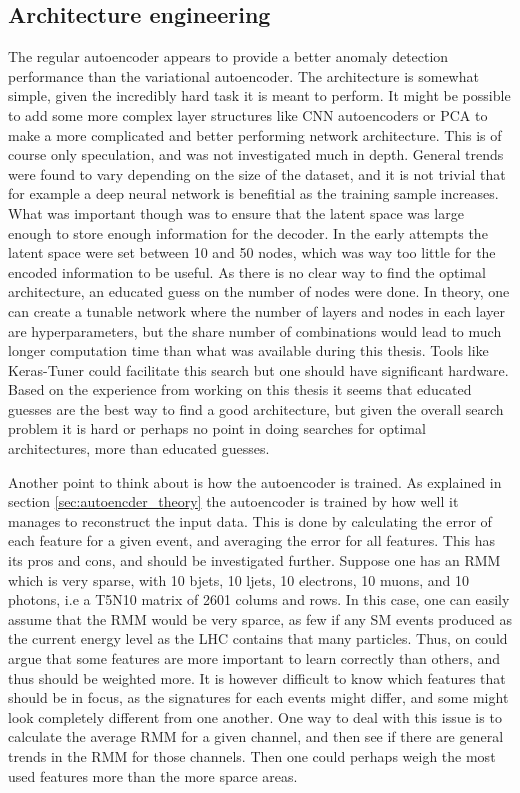 \subsection*{Architecture engineering}
The regular autoencoder appears to provide a better anomaly detection performance than the variational autoencoder. 
The architecture is somewhat simple, given the incredibly hard task it is meant to perform. It might be possible to 
add some more complex layer structures like CNN autoencoders or PCA to make a more complicated and better performing 
network architecture. This is of course only speculation, and was not investigated much in depth. General trends were 
found to vary depending on the size of the dataset, and it is not trivial that for example a deep neural network is 
benefitial as the training sample increases. What was important though was to ensure that the latent space was large 
enough to store enough information for the decoder. In the early attempts the latent space were set between 10 and 50 
nodes, which was way too little for the encoded information to be useful. As there is no clear way to find the optimal 
architecture, an educated guess on the number of nodes were done. In theory, one can create a tunable network where 
the number of layers and nodes in each layer are hyperparameters, but the share number of combinations would lead to 
much longer computation time than what was available during this thesis. Tools like Keras-Tuner could facilitate 
this search but one should have significant hardware. Based on the experience from working on this thesis it seems 
that educated guesses are the best way to find a good architecture, but given the overall search problem it is hard 
or perhaps no point in doing searches for optimal architectures, more than educated guesses. \par 
Another point to think about is how the autoencoder is trained. As explained in section \ref{sec:autoencder_theory}
the autoencoder is trained by how well it manages to reconstruct the input data. This is done by 
calculating the error of each feature for a given event, and averaging the error for all features. 
This has its pros and cons, and should be investigated further. Suppose one has an RMM which is very sparse, 
with 10 bjets, 10 ljets, 10 electrons, 10 muons, and 10 photons, i.e a T5N10 matrix of 2601 colums and rows. 
In this case, one can easily assume that the RMM would be very sparce, as few if any SM events produced 
as the current energy level as the LHC contains that many particles. Thus, on could argue that some features 
are more important to learn correctly than others, and thus should be weighted more. It is however difficult to 
know which features that should be in focus, as the signatures for each events might differ, and some 
might look completely different from one another. One way to deal with this issue is to calculate 
the average RMM for a given channel, and then see if there are general trends in the RMM for those channels. 
Then one could perhaps weigh the most used features more than the more sparce areas. 